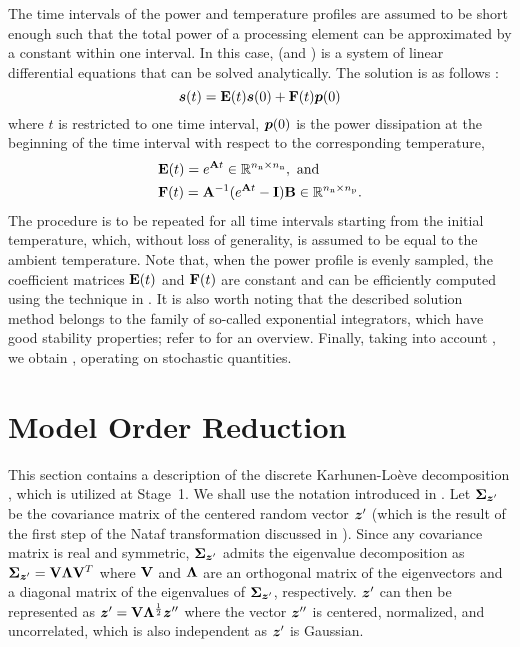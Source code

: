 The time intervals of the power and temperature profiles are assumed to be short
enough such that the total power of a processing element can be approximated by
a constant within one interval. In this case,  (and
) is a system of linear differential equations that can be
solved analytically. The solution is as follows \cite{ukhov2012}:
\begin{equation} \elab{ode-solution}
  \vs(t) = \m{E}(t) \vs(0) + \m{F}(t) \vp(0)
\end{equation}
where $t$ is restricted to one time interval, $\boldsymbol{p}(0)$ is the power dissipation
at the beginning of the time interval with respect to the corresponding
temperature,
\begin{align*}
  & \mathbf{E}(t) = e^{\mathbf{A} t} \in \mathbb{R}^{{n_\mathrm{n}} \times {n_\mathrm{n}}}, \text{ and} \\
  & \mathbf{F}(t) = \mathbf{A}^{-1} (e^{\mathbf{A} t} - \mathbf{I}) \mathbf{B} \in \mathbb{R}^{{n_\mathrm{n}} \times {n_\mathrm{p}}}.
\end{align*}
The procedure is to be repeated for all \ns time intervals starting from the
initial temperature, which, without loss of generality, is assumed to be equal
to the ambient temperature. Note that, when the power profile is evenly sampled,
the coefficient matrices $\mathbf{E}(t)$ and $\mathbf{F}(t)$ are constant and can be
efficiently computed using the technique in \cite{ukhov2012}. It is also worth
noting that the described solution method belongs to the family of so-called
exponential integrators, which have good stability properties; refer to
\cite{hochbruck2010} for an overview. Finally, taking into account \vu, we
obtain , operating on stochastic quantities.

\section{Model Order Reduction}

This section contains a description of the discrete Karhunen-Lo\`{e}ve
decomposition \cite{ghanem1991}, which is utilized at Stage~1. We shall use the
notation introduced in . Let $\mathbf{\Sigma}_{\boldsymbol{z}'}$
be the covariance matrix of the centered random vector $\boldsymbol{z}'$ (which is the
result of the first step of the Nataf transformation discussed in
). Since any covariance matrix is real and
symmetric, $\mathbf{\Sigma}_{\boldsymbol{z}'}$ admits the eigenvalue decomposition as
$\mathbf{\Sigma}_{\boldsymbol{z}'} = \mathbf{V} \mathbf{\Lambda} \mathbf{V}^T$ where $\mathbf{V}$ and $\mathbf{\Lambda}$
are an orthogonal matrix of the eigenvectors and a diagonal matrix of the
eigenvalues of $\mathbf{\Sigma}_{\boldsymbol{z}'}$, respectively. $\boldsymbol{z}'$ can then be represented
as $\boldsymbol{z}' = \mathbf{V} \mathbf{\Lambda}^\frac{1}{2} \boldsymbol{z}''$ where the vector $\boldsymbol{z}''$ is
centered, normalized, and uncorrelated, which is also independent as $\boldsymbol{z}'$ is
Gaussian.

